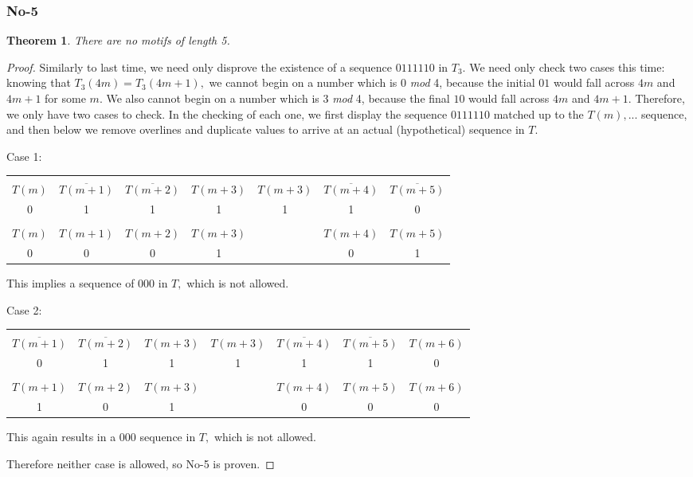 \documentclass{article}
\newtheorem{theorem}{Theorem}[section]
\begin{document}
\subsubsection{No-5}

\begin{theorem}
There are no motifs of length 5.
\end{theorem}

\begin{proof}
Similarly to last time, we need only disprove the existence of a sequence $0111110$ in $T_3.$ We need only check two cases this time: knowing that $T_3(4m) = T_3(4m + 1),$ we cannot begin on a number which is 0 \emph{mod} 4, because the initial $01$ would fall across $4m$ and $4m+1$ for some $m.$ We also cannot begin on a number which is 3 \emph{mod} 4, because the final $10$ would fall across $4m$ and $4m+1.$ Therefore, we only have two cases to check. In the checking of each one, we first display the sequence $0111110$ matched up to the $T(m), ...$ sequence, and then below we remove overlines and duplicate values to arrive at an actual (hypothetical) sequence in $T.$

Case 1:

\begin{center}
\begin{tabular}{ |c|c|c|c|c|c|c| } 
 \hline
 &&&&&&\\
$T(m)$ & $\overline{T(m+1)}$ & $\overline{T(m+2)}$ & $T(m+3)$ & $T(m+3)$ & $\overline{T(m+4)}$ & $\overline{T(m+5)}$ \\ 
0 & 1 & 1 & 1 & 1 & 1 & 0 \\
\hline
&&&&&&\\
$T(m)$ & $T(m+1)$ & $T(m+2)$ & $T(m+3)$ & & $T(m+4)$ & $T(m+5)$ \\
0 & 0 & 0 & 1 & & 0 & 1 \\
 \hline
\end{tabular}
\end{center}

This implies a sequence of $000$ in $T,$ which is not allowed.

Case 2:

\begin{center}
\begin{tabular}{ |c|c|c|c|c|c|c| } 
 \hline
 &&&&&&\\
$\overline{T(m+1)}$ & $\overline{T(m+2)}$ & $T(m+3)$ & $T(m+3)$ & $\overline{T(m+4)}$ & $\overline{T(m+5)}$ & $T(m+6)$\\ 
0 & 1 & 1 & 1 & 1 & 1 & 0 \\
\hline
&&&&&&\\
$T(m+1)$ & $T(m+2)$ & $T(m+3)$ & & $T(m+4)$ & $T(m+5)$ & $T(m+6)$ \\
 1 & 0 & 1 & & 0 & 0 & 0 \\
 \hline
\end{tabular}
\end{center}

This again results in a $000$ sequence in $T,$ which is not allowed.

Therefore neither case is allowed, so No-5 is proven.
\end{proof}
\end{document}

